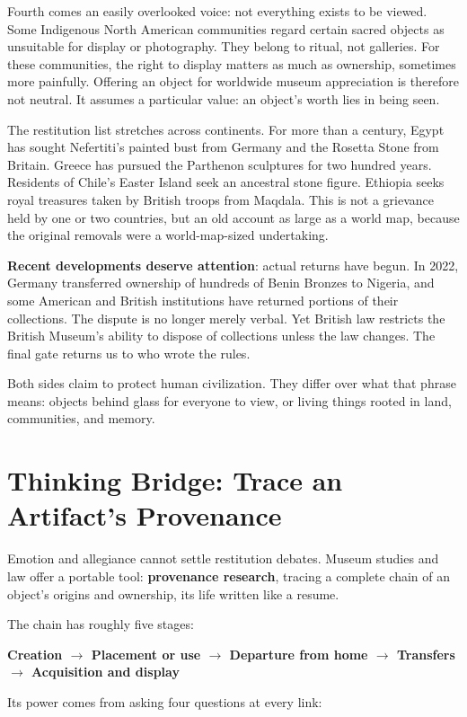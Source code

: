 Fourth comes an easily overlooked voice: not everything exists to be viewed. Some Indigenous North American communities regard certain sacred objects as unsuitable for display or photography. They belong to ritual, not galleries. For these communities, the right to display matters as much as ownership, sometimes more painfully. Offering an object for worldwide museum appreciation is therefore not neutral. It assumes a particular value: an object's worth lies in being seen.

The restitution list stretches across continents. For more than a century, Egypt has sought Nefertiti's painted bust from Germany and the Rosetta Stone from Britain. Greece has pursued the Parthenon sculptures for two hundred years. Residents of Chile's Easter Island seek an ancestral stone figure. Ethiopia seeks royal treasures taken by British troops from Maqdala. This is not a grievance held by one or two countries, but an old account as large as a world map, because the original removals were a world-map-sized undertaking.

\textbf{Recent developments deserve attention}: actual returns have begun. In 2022, Germany transferred ownership of hundreds of Benin Bronzes to Nigeria, and some American and British institutions have returned portions of their collections. The dispute is no longer merely verbal. Yet British law restricts the British Museum's ability to dispose of collections unless the law changes. The final gate returns us to who wrote the rules.

Both sides claim to protect human civilization. They differ over what that phrase means: objects behind glass for everyone to view, or living things rooted in land, communities, and memory.

\section[Thinking Bridge: Tracing Provenance]{Thinking Bridge: Trace an Artifact's Provenance}
Emotion and allegiance cannot settle restitution debates. Museum studies and law offer a portable tool: \textbf{provenance research}, tracing a complete chain of an object's origins and ownership, its life written like a resume.

The chain has roughly five stages:

\textbf{Creation $\rightarrow$ Placement or use $\rightarrow$ Departure from home $\rightarrow$ Transfers $\rightarrow$ Acquisition and display}

Its power comes from asking four questions at every link:

